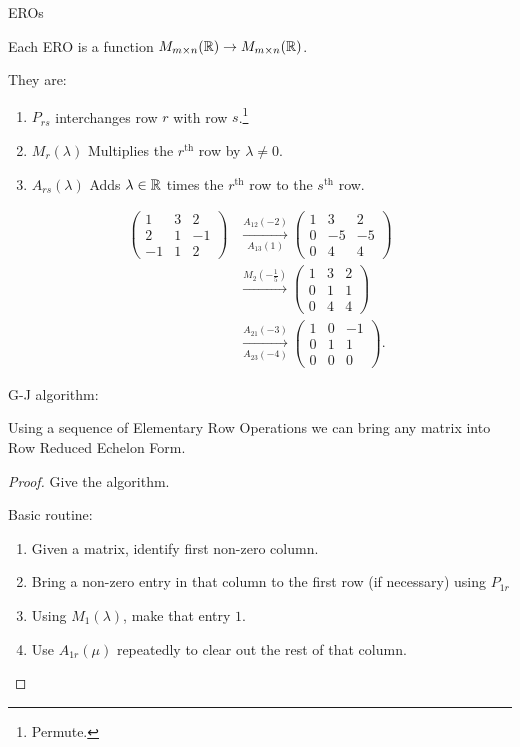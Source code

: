 \documentclass[10pt, a4paper]{article}
\begin{document}
EROs

Each ERO is a function $M_{m \times n}(\mathbb{R}) \rightarrow M_{m \times n}(\mathbb{R})$.

They are:
\begin{enumerate}[label = (\roman*)]
    \item $P_{rs}$ interchanges row $r$ with row $s$.\footnote{Permute.}
    \item $M_r(\lambda)$ Multiplies the $r^{\text{th}}$ row by $\lambda \neq 0$.
    \item $A_{rs}(\lambda)$ Adds $\lambda \in \mathbb{R}$ times the $r^{\text{th}}$ row to the $s^{\text{th}}$ row.
\end{enumerate}

\begin{example}
    \begin{align*}
    \begin{pmatrix}
        1 & 3 & 2 \\
        2 & 1 & -1 \\
        -1 & 1 & 2
    \end{pmatrix}
    &\xrightarrow[A_{13}(1)]{A_{12}(-2)}
    \begin{pmatrix}
        1 & 3 & 2 \\
        0 & -5 & -5 \\
        0 & 4 & 4
    \end{pmatrix} \\
    &\xrightarrow{M_2(-\frac{1}{5})}
    \begin{pmatrix}
        1 & 3 & 2 \\
        0 & 1 & 1 \\
        0 & 4 & 4
    \end{pmatrix} \\
    &\xrightarrow[A_{23}(-4)]{A_{21}(-3)}
    \begin{pmatrix}
        1 & 0 & -1 \\
        0 & 1 & 1 \\
        0 & 0 & 0
    \end{pmatrix}.
    \end{align*}
\end{example}


G-J algorithm:
\begin{theorem}
    Using a sequence of Elementary Row Operations we can bring any matrix into Row Reduced Echelon Form.
    \begin{proof}
        Give the algorithm.

        Basic routine:
        \begin{enumerate}[label = (\arabic*)]
            \item  Given a matrix,
            identify first non-zero column.
            \item Bring a non-zero entry in that column to the first row (if necessary) using $P_{1 r}$
            \item Using $M_1(\lambda)$,
            make that entry $1$.
            \item Use $A_{1r}(\mu)$ repeatedly to clear out the rest of that column.
        \end{enumerate}
    \end{proof}
\end{theorem}
\end{document}

